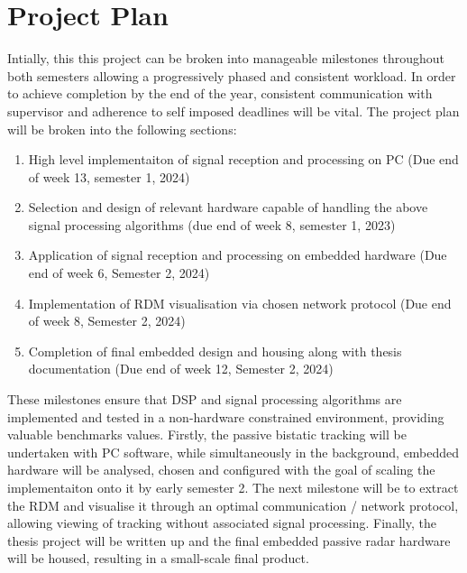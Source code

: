 \documentclass[12pt,a4paper]{article}
\begin{document}
\section{Project Plan}
Intially, this this project can be broken into manageable milestones throughout both semesters allowing a progressively phased and consistent workload. In order to achieve completion by the end of the year, consistent communication with supervisor and adherence to self imposed deadlines will be vital. The project plan will be broken into the following sections:
\begin{enumerate}[label=\arabic*.]
    \item High level implementaiton of signal reception and processing on PC (Due end of week 13, semester 1, 2024)
    \item Selection and design of relevant hardware capable of handling the above signal processing algorithms (due end of week 8, semester 1, 2023)
    \item Application of signal reception and processing on embedded hardware (Due end of week 6, Semester 2, 2024)
    \item Implementation of RDM visualisation via chosen network protocol (Due end of week 8, Semester 2, 2024)
    \item Completion of final embedded design and housing along with thesis documentation (Due end of week 12, Semester 2, 2024)
\end{enumerate}
\par \vspace{0.5cm} 
\noindent These milestones ensure that DSP and signal processing algorithms are implemented and tested in a non-hardware constrained environment, providing valuable benchmarks values. Firstly, the passive bistatic tracking will be undertaken with PC software, while simultaneously in the background, embedded hardware will be analysed, chosen and configured with the goal of scaling the implementaiton onto it by early semester 2. The next milestone will be to extract the RDM and visualise it through an optimal communication / network protocol, allowing viewing of tracking without associated signal processing. Finally, the thesis project will be written up and the final embedded passive radar hardware will be housed, resulting in a small-scale final product.
\end{document}
